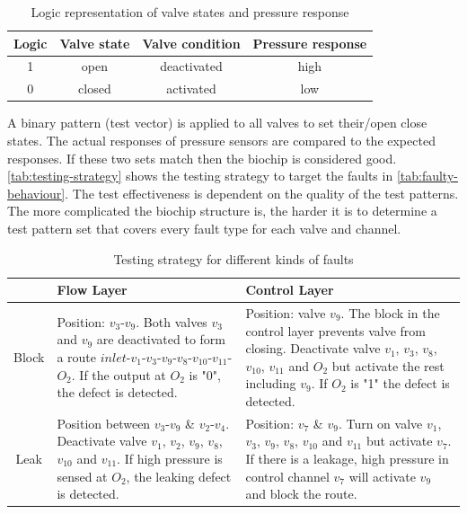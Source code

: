 \begin{table}[H]
\centering
\caption{Logic representation of valve states and pressure response \cite{fault-modeling}}
\begin{tabular}{| c | c | c | c |}
\hline
\textbf{Logic} & \textbf{Valve state} & \textbf{Valve condition} & \textbf{Pressure response}\\ \hline
1 & open & deactivated & high\\ \hline
0 & closed & activated & low \\ \hline
\end{tabular}
\label{tab:valve-logic}
\end{table}

A binary pattern (test vector) is applied to all valves to set their/open close states. The actual responses of pressure sensors are compared to the expected responses. If these two sets match then the biochip is considered good.\\

\autoref{tab:testing-strategy} shows the testing strategy to target the faults in \autoref{tab:faulty-behaviour}. The test effectiveness is dependent on the quality of the test patterns. The more complicated the biochip structure is, the harder it is to determine a test pattern set that covers every fault type for each valve and channel.

\begin{table}[H]
\centering
\caption{Testing strategy for different kinds of faults \cite{fault-modeling}}
\begin{tabular}{| c | >{\centering\arraybackslash} m{4.8cm} | >{\centering\arraybackslash} m{4.8cm} |}
\hline
${}$ & \textbf{Flow Layer} & \textbf{Control Layer}\\ \hline
Block & Position: $v_3$-$v_9$. Both valves $v_3$ and $v_9$ are deactivated to form a route $inlet$-$v_1$-$v_3$-$v_9$-$v_8$-$v_{10}$-$v_{11}$-$O_2$. If the output at $O_2$ is "0", the defect is detected. & Position: valve $v_9$. The block in the control layer prevents valve from closing. Deactivate valve $v_1$, $v_3$, $v_8$, $v_{10}$, $v_{11}$ and $O_2$ but activate the rest including $v_9$. If $O_2$ is "1" the defect is detected. \\ \hline
Leak & Position between $v_3$-$v_9$ \& $v_2$-$v_4$. Deactivate valve $v_1$, $v_2$, $v_9$, $v_8$, $v_{10}$ and $v_{11}$. If high pressure is sensed at $O_2$, the leaking defect is detected. & Position: $v_7$ \& $v_9$. Turn on valve $v_1$, $v_3$, $v_9$, $v_8$, $v_{10}$ and $v_{11}$ but activate $v_7$. If there is a leakage, high pressure in control channel $v_7$ will activate $v_9$ and block the route.\\ \hline
\end{tabular}
\label{tab:testing-strategy}
\end{table}

